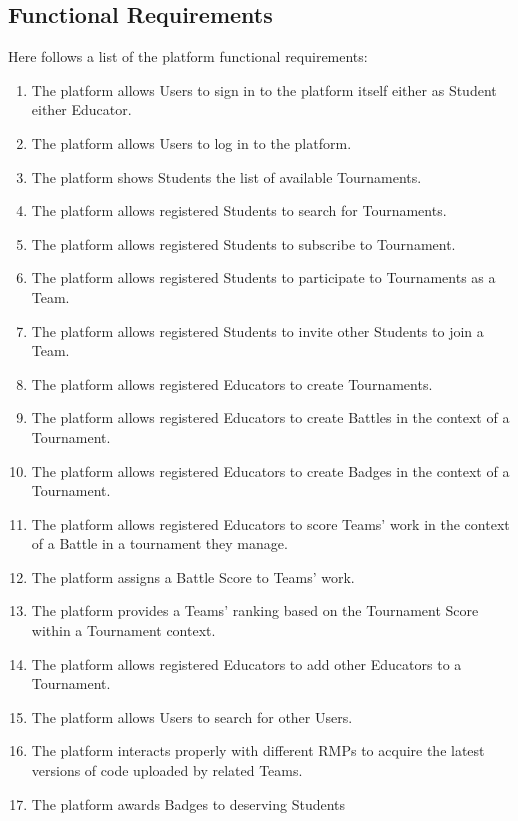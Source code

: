 \subsection{Functional Requirements}
Here follows a list of the platform functional requirements:
\begin{enumerate}[label= \textbf{R\arabic*}]
    \item The platform allows Users to sign in to the platform itself either as Student either Educator. \label{req:reqSignin}
    \item The platform allows Users to log in to the platform. \label{req:reqLogin}
    \item The platform shows Students the list of available Tournaments. \label{req:reqShowTournaments}
    \item The platform allows registered Students to search for Tournaments. \label{req:reqSearchForTournament}
    \item The platform allows registered Students to subscribe to Tournament. \label{req:reqTournamentSubscription}
    \item The platform allows registered Students to participate to Tournaments as a Team. \label{req:reqCreateTeam}
    \item The platform allows registered Students to invite other Students to join a Team. \label{req:reqJoinTeam}
    \item The platform allows registered Educators to create Tournaments. \label{req:reqCreateTournaments}
    \item The platform allows registered Educators to create Battles in the context of a Tournament. \label{req:reqCreateBattle}
    \item The platform allows registered Educators to create Badges in the context of a Tournament. \label{req:reqCreateBadge}
    \item The platform allows registered Educators to score Teams' work in the context of a Battle in a tournament they manage. \label{req:reqManualEvalCode}
    \item The platform assigns a Battle Score to Teams' work. \label{req:reqEvaluateCode}
    \item The platform provides a Teams' ranking based on the Tournament Score within a Tournament context. \label{req:reqRankingsUpdate}
    \item The platform allows registered Educators to add other Educators to a Tournament. \label{req:reqJoinManagement}
    \item The platform allows Users to search for other Users. \label{req:reqSearchForUsers}
    \item The platform interacts properly with different RMPs to acquire the latest versions of code uploaded by related Teams. \label{req:reqPullRMP}
    \item The platform awards Badges to deserving Students \label{req:reqAssignBadge}
\end{enumerate}


